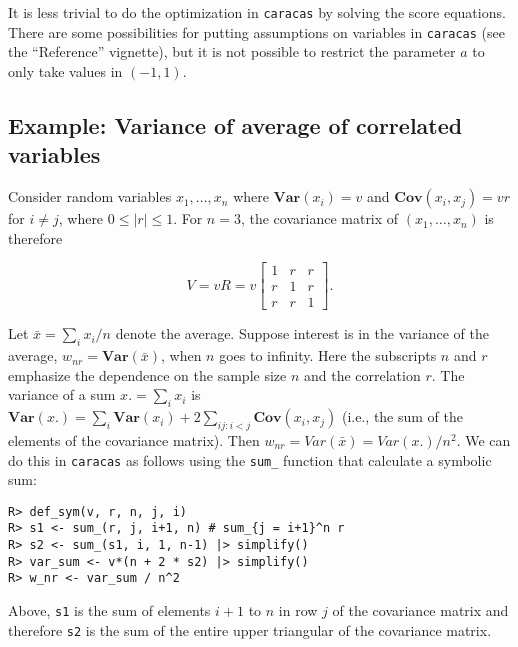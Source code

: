 It is less trivial to do the optimization in \texttt{caracas} by solving the score equations.
There are some possibilities for putting assumptions on variables
in \texttt{caracas} (see the ``Reference'' vignette), but
it is not possible to restrict the parameter \(a\) to only take values in \((-1, 1)\).

\hypertarget{example-variance-of-average-of-correlated-variables}{%
\subsection{Example: Variance of average of correlated variables}\label{example-variance-of-average-of-correlated-variables}}

Consider random
variables \(x_1,\dots, x_n\) where \(\mathbf{Var}(x_i)=v\) and \(\mathbf{Cov}(x_i, x_j)=v r\) for \(i\not = j\), where \(0 \le |r| \le1\).
For \(n=3\), the covariance matrix of \((x_1,\dots, x_n)\) is therefore

\begin{equation}
  \label{eq:1}
  V = v R = v \left[\begin{matrix}1 & r & r\\r & 1 & r\\r & r & 1\end{matrix}\right]. 
\end{equation}

Let \(\bar x = \sum_i x_i / n\) denote the average. Suppose interest is
in the variance of the average, \(w_{nr}=\mathbf{Var}(\bar x)\), when \(n\) goes
to infinity. Here the
subscripts \(n\) and \(r\) emphasize the dependence on the sample size \(n\)
and the correlation \(r\).
The variance of a sum \(x. = \sum_i x_i\) is
\(\mathbf{Var}(x.) = \sum_i \mathbf{Var}(x_i) + 2 \sum_{ij:i<j} \mathbf{Cov}(x_i, x_j)\) (i.e., the sum of the elements of the
covariance matrix). Then \(w_{nr}=Var(\bar x) = Var(x.)/n^2\).
We can do this in \texttt{caracas} as follows using the \texttt{sum\_} function
that calculate a symbolic sum:

\begin{verbatim}
R> def_sym(v, r, n, j, i)
R> s1 <- sum_(r, j, i+1, n) # sum_{j = i+1}^n r
R> s2 <- sum_(s1, i, 1, n-1) |> simplify()
R> var_sum <- v*(n + 2 * s2) |> simplify()
R> w_nr <- var_sum / n^2
\end{verbatim}

Above, \texttt{s1} is the sum of elements \(i+1\) to \(n\) in row \(j\) of the covariance matrix
and therefore \texttt{s2} is the sum of the entire upper triangular of the covariance matrix.


